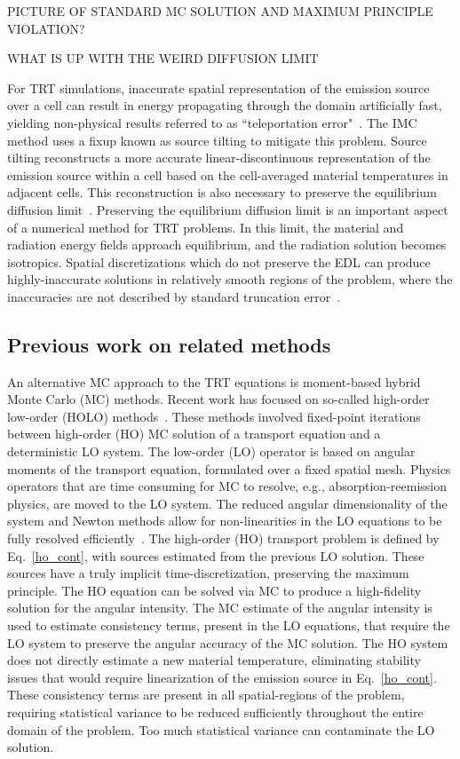 \documentclass[11pt]{article}
\begin{document}
PICTURE OF STANDARD MC SOLUTION AND MAXIMUM PRINCIPLE VIOLATION?

WHAT IS UP WITH THE WEIRD DIFFUSION LIMIT
 
For TRT simulations, inaccurate spatial representation of the emission source over a cell can result in
energy propagating through the domain artificially fast, yielding non-physical
results referred to as ``teleportation error"~\cite{teleportation}.  The IMC method uses a fixup known as source tilting
to mitigate this problem.  Source tilting reconstructs a more accurate
linear-discontinuous representation of the
emission source within a cell based on the cell-averaged material temperatures in adjacent
cells. This reconstruction is also necessary to preserve the equilibrium diffusion
limit~\cite{diff_limit_imc}.  Preserving the equilibrium diffusion limit is an
important aspect of a numerical method for TRT problems.  In this limit, the material
and radiation energy fields approach equilibrium, and the radiation solution becomes
isotropics.  Spatial discretizations which do not preserve the EDL can produce highly-inaccurate
solutions in relatively smooth regions of the problem, where the inaccuracies are not described by standard truncation
error~\cite{morel_newton}.

\subsection{Previous work on related methods}

An alternative MC approach to the TRT equations is moment-based hybrid Monte
Carlo (MC) methods.  Recent work has focused on so-called high-order low-order (HOLO)
methods~\cite{willert,park,rmc,ans_2014}. These methods involved fixed-point
iterations between high-order (HO) MC solution of a transport equation and a deterministic LO
system.  The low-order (LO)
operator is based on angular moments of the transport equation, formulated over a fixed
spatial mesh.  Physics operators that are time consuming for MC
to resolve, e.g., absorption-reemission physics, are moved to the LO
system.  The reduced angular dimensionality of the system and Newton methods allow for non-linearities in the LO equations to be fully
resolved efficiently~\cite{willert,park}.  The high-order (HO) transport problem is defined by 
Eq.~\eqref{ho_cont}, with sources estimated from the previous LO solution.  These
sources have a truly implicit time-discretization, preserving the maximum principle.
The HO equation can be solved via MC to produce a high-fidelity solution for
the angular intensity.  The MC estimate of the angular intensity is used to estimate
consistency terms,
present in the LO equations, that require the LO system to preserve the angular accuracy of the
MC solution.  The HO system does not directly estimate a new material temperature,
eliminating stability issues that would require linearization of the emission source
in Eq.~\eqref{ho_cont}.  
These consistency terms are present in all spatial-regions of the problem, requiring
statistical variance to be reduced sufficiently throughout the entire domain of the
problem. Too much statistical variance can contaminate the LO solution.
\end{document}
